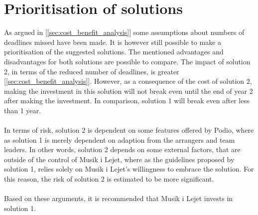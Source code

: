 \section{Prioritisation of solutions}
As argued in [\ref{sec:cost_benefit_analysis}] some assumptions about numbers of deadlines missed have been made. It is however still possible to make a prioritisation of the suggested solutions.
The mentioned advantages and disadvantages for both solutions are possible to compare. The impact of
solution 2, in terms of the reduced number of deadlines, is greater
[\ref{sec:cost_benefit_analysis}]. However, as a consequence of the cost of solution 2, making the
investment in this solution will not break even until the end of year 2 after making the investment. In comparison, solution 1 will break even after less than 1 year.
\\ \\
In terms of risk, solution 2 is dependent on some features offered by Podio, where as solution 1 is merely dependent on adaption from the arrangers and team leaders. In other words, solution 2 depends on some external factors, that are outside of the control of Musik i Lejet, where as the guidelines proposed by solution 1, relies solely on Musik i Lejet's willingness to embrace the solution. For this reason, the risk of solution 2 is estimated to be more significant.
\\ \\
Based on these arguments, it is recommended that Musik i Lejet invests in solution 1. 

\pagebreak
